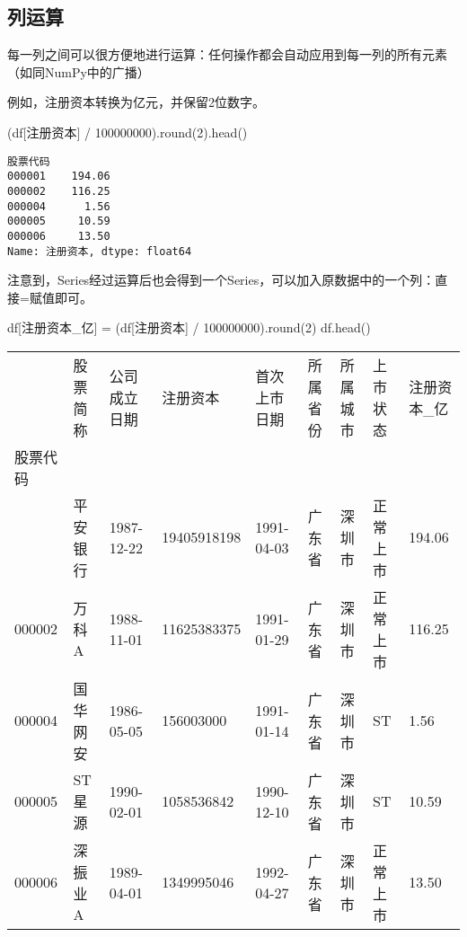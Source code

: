 \documentclass[
  letterpaper,
  DIV=11,
  numbers=noendperiod]{scrreprt}
\newenvironment{Shaded}{\begin{snugshade}}{\end{snugshade}}
\newcommand{\BuiltInTok}[1]{\textcolor[rgb]{0.00,0.23,0.31}{#1}}
\newcommand{\DecValTok}[1]{\textcolor[rgb]{0.68,0.00,0.00}{#1}}
\newcommand{\NormalTok}[1]{\textcolor[rgb]{0.00,0.23,0.31}{#1}}
\newcommand{\OperatorTok}[1]{\textcolor[rgb]{0.37,0.37,0.37}{#1}}
\newcommand{\StringTok}[1]{\textcolor[rgb]{0.13,0.47,0.30}{#1}}
\begin{document}
\hypertarget{ux5217ux8fd0ux7b97}{%
\subsection{列运算}\label{ux5217ux8fd0ux7b97}}

每一列之间可以很方便地进行运算：任何操作都会自动应用到每一列的所有元素（如同NumPy中的广播）

例如，注册资本转换为亿元，并保留2位数字。

\begin{Shaded}
\begin{Highlighting}[]
\NormalTok{(df[}\StringTok{\textquotesingle{}注册资本\textquotesingle{}}\NormalTok{] }\OperatorTok{/} \DecValTok{100000000}\NormalTok{).}\BuiltInTok{round}\NormalTok{(}\DecValTok{2}\NormalTok{).head()}
\end{Highlighting}
\end{Shaded}

\begin{verbatim}
股票代码
000001    194.06
000002    116.25
000004      1.56
000005     10.59
000006     13.50
Name: 注册资本, dtype: float64
\end{verbatim}

注意到，Series经过运算后也会得到一个Series，可以加入原数据中的一个列：直接=赋值即可。

\begin{Shaded}
\begin{Highlighting}[]
\NormalTok{df[}\StringTok{\textquotesingle{}注册资本\_亿\textquotesingle{}}\NormalTok{] }\OperatorTok{=}\NormalTok{ (df[}\StringTok{\textquotesingle{}注册资本\textquotesingle{}}\NormalTok{] }\OperatorTok{/} \DecValTok{100000000}\NormalTok{).}\BuiltInTok{round}\NormalTok{(}\DecValTok{2}\NormalTok{)}
\NormalTok{df.head()}
\end{Highlighting}
\end{Shaded}

\begin{longtable}[]{@{}lllllllll@{}}
\toprule\noalign{}
& 股票简称 & 公司成立日期 & 注册资本 & 首次上市日期 & 所属省份 &
所属城市 & 上市状态 & 注册资本\_亿 \\
股票代码 & & & & & & & & \\
\midrule\noalign{}
\endhead
\bottomrule\noalign{}
\endlastfoot
000001 & 平安银行 & 1987-12-22 & 19405918198 & 1991-04-03 & 广东省 &
深圳市 & 正常上市 & 194.06 \\
000002 & 万科A & 1988-11-01 & 11625383375 & 1991-01-29 & 广东省 & 深圳市
& 正常上市 & 116.25 \\
000004 & 国华网安 & 1986-05-05 & 156003000 & 1991-01-14 & 广东省 &
深圳市 & ST & 1.56 \\
000005 & ST 星源 & 1990-02-01 & 1058536842 & 1990-12-10 & 广东省 &
深圳市 & ST & 10.59 \\
000006 & 深振业A & 1989-04-01 & 1349995046 & 1992-04-27 & 广东省 &
深圳市 & 正常上市 & 13.50 \\
\end{longtable}
\end{document}
